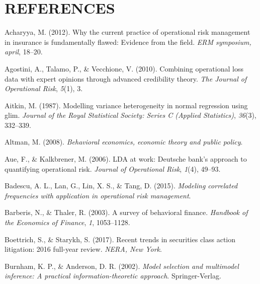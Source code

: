 \documentclass{DissertateUSU}
\begin{document}
\singlespacing

\FloatBarrier
\newpage
{}
\fancyhead[R]{\thepage}
\fancyfoot[C]{}

\chapter*{REFERENCES}

\setlength{\parindent}{-0.5in}
\setlength{\leftskip}{0.4in}
\setlength{\parskip}{6pt}

\noindent

\hypertarget{refs}{}
\leavevmode\hypertarget{ref-acharyya2012current}{}%
Acharyya, M. (2012). Why the current practice of operational risk
management in insurance is fundamentally flawed: Evidence from the
field. \emph{ERM symposium, april}, 18--20.

\leavevmode\hypertarget{ref-agostini2010combining}{}%
Agostini, A., Talamo, P., \& Vecchione, V. (2010). Combining operational
loss data with expert opinions through advanced credibility theory.
\emph{The Journal of Operational Risk}, \emph{5}(1), 3.

\leavevmode\hypertarget{ref-aitkin1987modelling}{}%
Aitkin, M. (1987). Modelling variance heterogeneity in normal regression
using glim. \emph{Journal of the Royal Statistical Society: Series C
(Applied Statistics)}, \emph{36}(3), 332--339.

\leavevmode\hypertarget{ref-altman2008behavioral}{}%
Altman, M. (2008). \emph{Behavioral economics, economic theory and
public policy}.

\leavevmode\hypertarget{ref-aue2006lda}{}%
Aue, F., \& Kalkbrener, M. (2006). LDA at work: Deutsche bank's approach
to quantifying operational risk. \emph{Journal of Operational Risk},
\emph{1}(4), 49--93.

\leavevmode\hypertarget{ref-badescu2015modeling}{}%
Badescu, A. L., Lan, G., Lin, X. S., \& Tang, D. (2015). \emph{Modeling
correlated frequencies with application in operational risk management}.

\leavevmode\hypertarget{ref-barberis2003survey}{}%
Barberis, N., \& Thaler, R. (2003). A survey of behavioral finance.
\emph{Handbook of the Economics of Finance}, \emph{1}, 1053--1128.

\leavevmode\hypertarget{ref-boettrich2017recent}{}%
Boettrich, S., \& Starykh, S. (2017). Recent trends in securities class
action litigation: 2016 full-year review. \emph{NERA, New York}.

\leavevmode\hypertarget{ref-Burnham2002}{}%
Burnham, K. P., \& Anderson, D. R. (2002). \emph{Model selection and
multimodel inference: A practical information-theoretic approach}.
Springer-Verlag.
\end{document}
